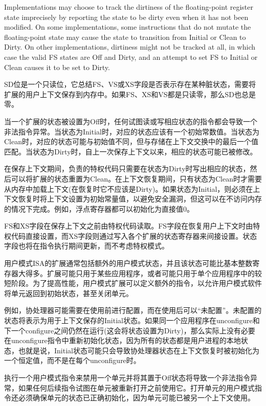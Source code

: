 Implementations may choose to track the dirtiness of the floating-point
register state imprecisely by reporting the state to be dirty even when
it has not been modified.  On some implementations, some instructions that
do not mutate the floating-point state may cause the state to transition from
Initial or Clean to Dirty.  On other implementations, dirtiness might not be
tracked at all, in which case the valid FS states are Off and Dirty, and an
attempt to set FS to Initial or Clean causes it to be set to Dirty.
\fi

SD位是一个只读位，它总结FS、VS或XS字段是否表示存在某种脏状态，需要将扩展的用户上下文保存到内存中。如果FS、XS和VS都是只读零，那么SD也总是零。

当一个扩展的状态被设置为Off时，任何试图读或写相应状态的指令都会导致一个非法指令异常。当状态为Initial时，对应的状态应该有一个初始常数值。当状态为Clean时，对应的状态可能与初始值不同，但与存储在上下文交换中的最后一个值匹配。当状态为Dirty时，自上一次保存上下文以来，相应的状态可能已被修改。

在保存上下文期间，负责的特权代码只需要在状态为Dirty时写出相应的状态，然后可以将扩展的状态重置为Clean。在上下文恢复期间，只有状态为Clean时才需要从内存中加载上下文(在恢复时它不应该是Dirty)。如果状态为Initial，则必须在上下文恢复时将上下文设置为初始常量值，以避免安全漏洞，但这可以在不访问内存的情况下完成。例如，浮点寄存器都可以初始化为直接值0。

FS和XS字段在保存上下文之前由特权代码读取。FS字段在恢复用户上下文时由特权代码直接设置，而XS字段则通过写入各个扩展的状态寄存器来间接设置。状态字段也将在指令执行期间更新，而不考虑特权模式。

用户模式ISA的扩展通常包括额外的用户模式状态，并且该状态可能比基本整数寄存器大得多。扩展可能只用于某些应用程序，或者可能只用于单个应用程序中的较短阶段。为了提高性能，用户模式扩展可以定义额外的指令，以允许用户模式软件将单元返回到初始状态，甚至关闭单元。

例如，协处理器可能需要在使用前进行配置，而在使用后可以“未配置”。未配置的状态将表示为用于上下文保存的Initial状态。如果同一个应用程序在unconfigure和下一个configure之间仍然在运行(这会将状态设置为Dirty)，那么实际上没有必要在unconfigure指令中重新初始化状态，因为所有的状态都是用户进程的本地状态，也就是说，Initial状态可能只会导致协处理器状态在上下文恢复时被初始化为一个恒定值，而不是在每个unconfigure时。

执行一个用户模式指令来禁用一个单元并将其置于Off状态将导致一个非法指令异常，如果任何后续指令试图在单元被重新打开之前使用它。打开单元的用户模式指令还必须确保单元的状态已正确初始化，因为单元可能已被另一个上下文使用。

